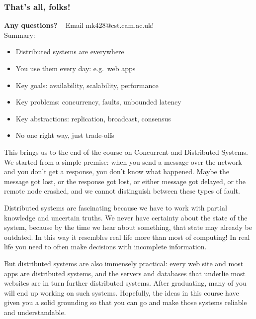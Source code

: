 \begin{frame}
    \label{s:conclusions}
    \frametitle{That's all, folks!}
    \textbf{Any questions?} ~ Email mk428@cst.cam.ac.uk!\\[1em]
    Summary:
    \begin{itemize}
        \item Distributed systems are everywhere
        \item You use them every day: e.g.\ web apps
        \item Key goals: availability, scalability, performance
        \item Key problems: concurrency, faults, unbounded latency
        \item Key abstractions: replication, broadcast, consensus
        \item No one right way, just trade-offs
    \end{itemize}
\end{frame}
\label{l:conclusions}

This brings us to the end of the course on Concurrent and Distributed Systems.
We started from a simple premise: when you send a message over the network and you don't get a response, you don't know what happened.
Maybe the message got lost, or the response got lost, or either message got delayed, or the remote node crashed, and we cannot distinguish between these types of fault.

Distributed systems are fascinating because we have to work with partial knowledge and uncertain truths.
We never have certainty about the state of the system, because by the time we hear about something, that state may already be outdated.
In this way it resembles real life more than most of computing!
In real life you need to often make decisions with incomplete information.

But distributed systems are also immensely practical: every web site and most apps are distributed systems, and the servers and databases that underlie most websites are in turn further distributed systems.
After graduating, many of you will end up working on such systems.
Hopefully, the ideas in this course have given you a solid grounding so that you can go and make those systems reliable and understandable.


\footnotesize

{}

